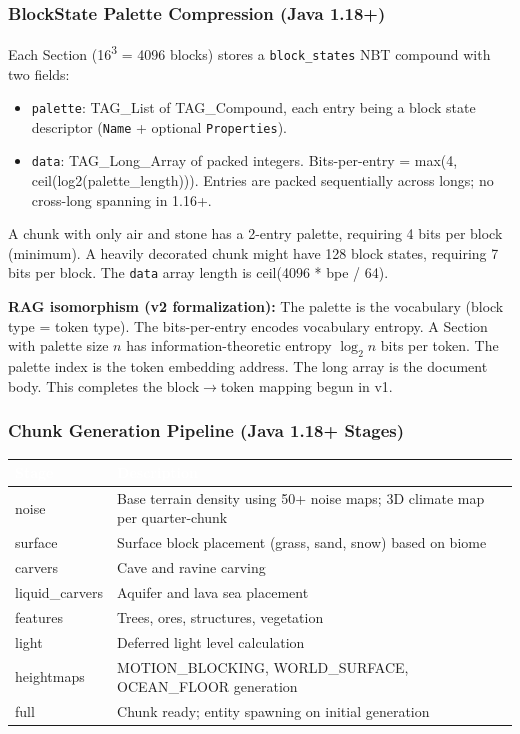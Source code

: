 \documentclass[11pt,letterpaper]{article}
\newcommand{\tableheader}[1]{\textbf{\sffamily\textcolor{white}{#1}}}
\begin{document}
\subsubsection{BlockState Palette Compression (Java 1.18+)}

Each Section (16\textsuperscript{3} = 4096 blocks) stores a \texttt{block\_states} NBT compound with two fields:
\begin{itemize}[leftmargin=2em]
  \item \texttt{palette}: TAG\_List of TAG\_Compound, each entry being a block state descriptor (\texttt{Name} + optional \texttt{Properties}).
  \item \texttt{data}: TAG\_Long\_Array of packed integers. Bits-per-entry = max(4, ceil(log2(palette\_length))). Entries are packed sequentially across longs; no cross-long spanning in 1.16+.
\end{itemize}

A chunk with only air and stone has a 2-entry palette, requiring 4 bits per block (minimum). A heavily decorated chunk might have 128 block states, requiring 7 bits per block. The \texttt{data} array length is ceil(4096 * bpe / 64).

\textbf{RAG isomorphism (v2 formalization):} The palette is the vocabulary (block type = token type). The bits-per-entry encodes vocabulary entropy. A Section with palette size $n$ has information-theoretic entropy $\log_2 n$ bits per token. The palette index is the token embedding address. The long array is the document body. This completes the block$\to$token mapping begun in v1.

\subsubsection{Chunk Generation Pipeline (Java 1.18+ Stages)}

\begin{center}
\begin{tabularx}{\textwidth}{L{3.5cm}X}
\toprule
{}
\tableheader{Stage} & \tableheader{Description} \\
\midrule
noise & Base terrain density using 50+ noise maps; 3D climate map per quarter-chunk \\
surface & Surface block placement (grass, sand, snow) based on biome \\
carvers & Cave and ravine carving \\
liquid\_carvers & Aquifer and lava sea placement \\
features & Trees, ores, structures, vegetation \\
light & Deferred light level calculation \\
heightmaps & MOTION\_BLOCKING, WORLD\_SURFACE, OCEAN\_FLOOR generation \\
full & Chunk ready; entity spawning on initial generation \\
\bottomrule
\end{tabularx}
\end{center}
\end{document}
